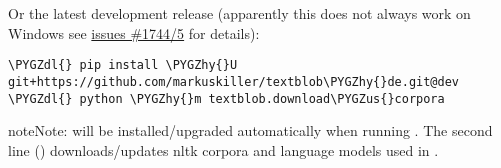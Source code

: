 \documentclass[letterpaper,10pt,english]{sphinxmanual}
\def\PYGZus{\char`\_}
\def\PYGZdl{\char`\$}
\def\PYGZhy{\char`\-}
\begin{document}
Or the latest development release (apparently this does not always work on Windows see
\href{https://github.com/pypa/pip/pull/1745}{issues \#1744/5} for details):

\begin{Verbatim}[commandchars=\\\{\}]
\PYGZdl{} pip install \PYGZhy{}U git+https://github.com/markuskiller/textblob\PYGZhy{}de.git@dev
\PYGZdl{} python \PYGZhy{}m textblob.download\PYGZus{}corpora
\end{Verbatim}

\begin{notice}{note}{Note:}
 will be installed/upgraded automatically when running
. The second line ()
downloads/updates nltk corpora and language models used in .
\end{notice}
\end{document}

